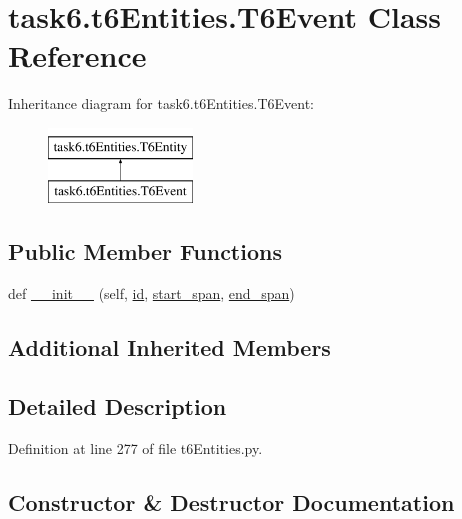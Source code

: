 \hypertarget{classtask6_1_1t6Entities_1_1T6Event}{}\section{task6.\+t6\+Entities.\+T6\+Event Class Reference}
\label{classtask6_1_1t6Entities_1_1T6Event}
Inheritance diagram for task6.\+t6\+Entities.\+T6\+Event\+:\begin{figure}[H]
\begin{center}
\leavevmode
\includegraphics[height=2.000000cm]{classtask6_1_1t6Entities_1_1T6Event}
\end{center}
\end{figure}
\subsection*{Public Member Functions}
\begin{DoxyCompactItemize}
\item 
def \hyperlink{classtask6_1_1t6Entities_1_1T6Event_a00594e097d608a203004934593b9faa9}{\+\_\+\+\_\+init\+\_\+\+\_\+} (self, \hyperlink{classtask6_1_1t6Entities_1_1T6Entity_afeeced8134bb3ebe0cfecc64d0ab46a4}{id}, \hyperlink{classtask6_1_1t6Entities_1_1T6Entity_a52779e9af8864dc98e8b02fc5b9b041a}{start\+\_\+span}, \hyperlink{classtask6_1_1t6Entities_1_1T6Entity_aeb402200b156cd9562c5111dfe777b98}{end\+\_\+span})
\end{DoxyCompactItemize}
\subsection*{Additional Inherited Members}


\subsection{Detailed Description}


Definition at line 277 of file t6\+Entities.\+py.



\subsection{Constructor \& Destructor Documentation}
\mbox{\label{classtask6_1_1t6Entities_1_1T6Event_a00594e097d608a203004934593b9faa9}} 
